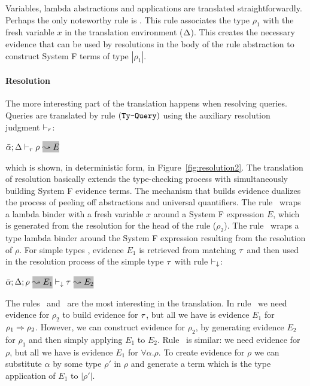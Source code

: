 Variables, lambda abstractions and applications
are translated straightforwardly. Perhaps the only noteworthy 
rule is \TyIAbs. This rule associates the type $\rho_1$ with 
the fresh variable $x$ in the translation environment ($\Delta$). 
This creates the necessary evidence that can be used by resolutions 
in the body of the rule abstraction to construct System F terms of type $|\rho_1|$. 

\paragraph{Resolution}
The more interesting part of the translation happens when 
resolving queries. Queries are translated by rule $\mbox{({\tt Ty-Query})}$ using the auxiliary
resolution judgment $\vdash_{r}$:
\begin{center}
$\bar{\alpha}; \env \vturns \rho~\gbox{\leadsto E}$
\end{center}

\noindent which is shown, in deterministic form, in Figure~\ref{fig:resolution2}.
The translation of resolution basically extends the type-checking
process with simultaneously building System F evidence terms. The mechanism that builds
evidence dualizes the process of peeling off abstractions and universal 
quantifiers. The rule ~wraps a lambda binder with a fresh variable 
$x$ around a System F expression $E$, which is generated from the resolution 
for the head of the rule ($\rho_2$). The rule ~wraps a type lambda binder 
around the System F expression resulting from the resolution of $\rho$.
For simple types , evidence $E_1$ is retrieved from matching 
$\tau$ and then used in the resolution process of the simple type 
$\tau$ with rule $\vdash_\downarrow$:

\begin{center}
$\bar{\alpha};\env; \rho~\gbox{\leadsto E_1} \turns_\downarrow \type~\gbox{\leadsto E_2}$
\end{center}

The rules ~and ~are the most interesting in the translation. 
In rule ~we need evidence for $\rho_2$ to build evidence for $\tau$, 
but all we have is evidence $E_1$ for $\rho_1 \Rightarrow \rho_2$. However, we can 
construct evidence for $\rho_2$, by generating evidence $E_2$ for $\rho_1$
and then simply applying $E_1$ to $E_2$. Rule ~is similar: we need 
evidence for $\rho$, but all we have is evidence $E_1$ for $\forall \alpha. \rho$. 
To create evidence for $\rho$ we can substitute $\alpha$ by some type 
$\rho'$ in $\rho$ and generate a term which is the type application of 
$E_1$ to $|\rho'|$. 

